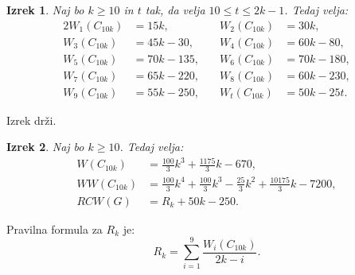 \documentclass[a4paper, 12pt]{article}
\newtheorem{izrek}{Izrek}[section]
\begin{document}
\begin{izrek}
    Naj bo $k \geq 10$ in $t$ tak, da velja $10 \leq t \leq 2k - 1$. Tedaj velja:
    \begin{alignat*}{2}
        W_1(C_{10k}) &= 15k,  &\quad W_2(C_{10k}) &= 30k, \\
        W_3(C_{10k}) &= 45k - 30, &\quad W_4(C_{10k}) &= 60k - 80, \\
        W_5(C_{10k}) &= 70k - 135, &\quad W_6(C_{10k}) &= 70k - 180, \\
        W_7(C_{10k}) &= 65k - 220, &\quad W_8(C_{10k}) &= 60k - 230, \\
        W_9(C_{10k}) &= 55k - 250, &\quad W_t(C_{10k}) &= 50k - 25t.
    \end{alignat*}
\end{izrek}

Izrek drži.

\begin{izrek}
    Naj bo $k \geq 10$. Tedaj velja:
    \begin{align*}
        W(C_{10k}) &= \frac{100}{3} k^3 + \frac{1175}{3} k - 670, \\
        WW(C_{10k}) &= \frac{100}{3} k^4 + \frac{100}{3} k^3 - \frac{25}{3} k^2 + \frac{10175}{3} k - 7200, \\
        RCW(G) &= R_k + 50k - 250.
    \end{align*}
\end{izrek}

Pravilna formula za $R_k$ je:
\begin{equation*}
    R_k = \sum_{i=1}^{9} \frac{W_i(C_{10k})}{2k - i}.
\end{equation*}
\end{document}
